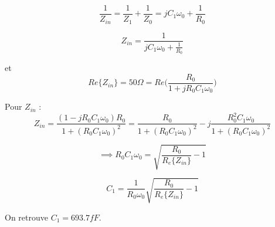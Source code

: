 \documentclass[a4paper]{article}
\begin{document}
\[
\frac{1}{Z_{in}} =\frac{1}{Z_1} + \frac{1}{Z_0} = jC_1\omega_0 + \frac{1}{R_0}
\]

\[
Z_{in} = \frac{1}{jC_1\omega_0 + \frac{1}{R_0}}
\]

et
\[
Re\{Z_{in}\} = 50 \Omega = Re\bigg(\frac{R_0}{1+ j R_0 C_1 \omega_0}\bigg)
\]

Pour $Z_{in}$ :
\[
Z_{in} = \frac{(1 - j R_0 C_1 \omega_0) R_0}{1 + (R_0 C_1 \omega_0)^2} =\frac{R_0}{1 + (R_0 C_1 \omega_0)^2} - j \frac{R^2_0 C_1 \omega_0} {1 + (R_0 C_1 \omega_0)^2}
\]

\[
\implies R_0 C_1 \omega_0 = \sqrt{\frac{R_0}{R_e\{Z_{in}\}} - 1}
\]

\[
 C_1  = \frac{1}{R_0 \omega_0}\sqrt{\frac{R_0}{R_e\{Z_{in}\}} - 1}
\]

On retrouve $ C_1 = 693.7 fF$.
\end{document}
